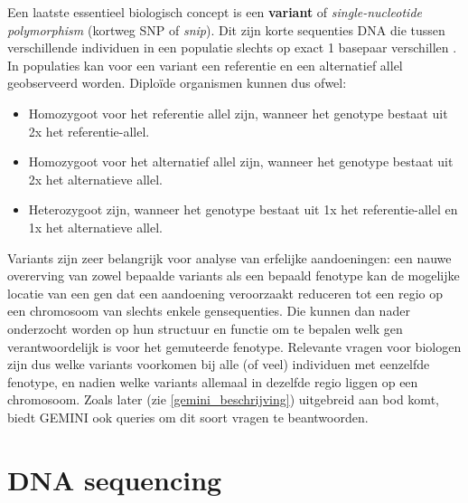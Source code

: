 Een laatste essentieel biologisch concept is een \textbf{variant} of \textit{single-nucleotide polymorphism} (kortweg SNP of \textit{snip}). Dit zijn korte sequenties DNA die tussen verschillende individuen in een populatie slechts op exact 1 basepaar verschillen \cite{alberts2007molecular}. In populaties kan voor een variant een referentie en een alternatief allel geobserveerd worden. Diplo\"ide organismen kunnen dus ofwel:
\begin{itemize}
\item Homozygoot voor het referentie allel zijn, wanneer het genotype bestaat uit 2x het referentie-allel.
\item Homozygoot voor het alternatief allel zijn, wanneer het genotype bestaat uit 2x het alternatieve allel.
\item Heterozygoot zijn, wanneer het genotype bestaat uit 1x het referentie-allel en 1x het alternatieve allel.
\end{itemize}

Variants zijn zeer belangrijk voor analyse van erfelijke aandoeningen: een nauwe overerving van zowel bepaalde variants als een bepaald fenotype kan de mogelijke locatie van een gen dat een aandoening veroorzaakt reduceren tot een regio op een chromosoom van slechts enkele gensequenties. Die kunnen dan nader onderzocht worden op hun structuur en functie om te bepalen welk gen verantwoordelijk is voor het gemuteerde fenotype. Relevante vragen voor biologen zijn dus welke variants voorkomen bij alle (of veel) individuen met eenzelfde fenotype, en nadien welke variants allemaal in dezelfde regio liggen op een chromosoom. Zoals later (zie \ref{gemini_beschrijving}) uitgebreid aan bod komt, biedt GEMINI ook queries om dit soort vragen te beantwoorden.

\section{DNA sequencing}

